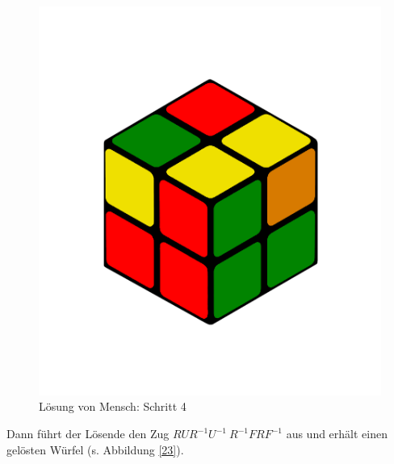 \documentclass[12pt,a4paper, usenames, dvipsnames]{article}
\theoremstyle{mystyle}
\theoremstyle{definition}
\begin{document}
\begin{figure}[H]
\centering
\includegraphics[scale=0.12]{menschSchritt4.png}
\caption[Lösung von Mensch: Schritt 4]{Lösung von Mensch: Schritt 4}
\label{22}
\end{figure} 

Dann führt der Lösende den Zug $RUR^{-1}U^{-1} \ R^{-1}FRF^{-1}$ aus \cite{RF2} und erhält einen gelösten Würfel (s. Abbildung \ref{23}). 
\end{document}
